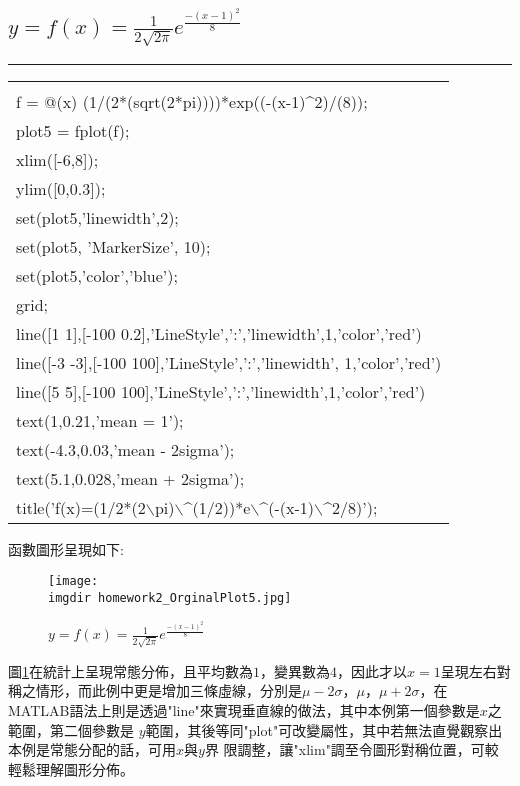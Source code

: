 		\subsection{$y=f(x)=\frac{1}{2\sqrt{2\pi}}e^{\frac{-(x-1)^2}{8}}$}%
		\rule{\textwidth}{0.2pt}
		\begin{center}\colorbox{slight}{
				\begin{tabular}{p{}}
					\MJHmarker{\textbf{MATLAB語法 :}}\\					
					f = @(x) (1/(2*(sqrt(2*pi))))*exp((-(x-1)$\^$2)/(8));\\
					plot5 = fplot(f);\\
					xlim([-6,8]);\\
					ylim([0,0.3]);\\
					set(plot5,'linewidth',2);\\
					set(plot5, 'MarkerSize', 10); \\
					set(plot5,'color','blue');\\
					grid;\\
					line([1 1],[-100 0.2],'LineStyle',':','linewidth',1,'color','red')
					\\line([-3 -3],[-100 100],'LineStyle',':','linewidth',									1,'color','red')\\
					line([5 5],[-100 100],'LineStyle',':','linewidth',1,'color','red')
					\\text(1,0.21,'mean = 1');\\
					text(-4.3,0.03,'mean - 2sigma');\\
					text(5.1,0.028,'mean + 2sigma');\\
					title('f(x)=(1/2*(2$\backslash$pi)$\backslash\^$(1/2))*e$								\backslash\^$(-(x-1)$\backslash\^$2/8)');\\
				\end{tabular}
			}
			\end{center}			
		\newpage
		函數圖形呈現如下:	
		\begin{figure}[H]	
		 	 \centering	 			 	 
   			 \texttt{[image: \\imgdir homework2\_OrginalPlot5.jpg]} 
   			 \caption{$y=f(x)=\frac{1}{2\sqrt{2\pi}}e^{\frac{-(x-1)^2}{8}}$}   		
   			 \label{plot5}   			 		 
		\end{figure}
		
		圖\ref{plot5}在統計上呈現常態分佈，且平均數為$1$，變異數為$4$，因此才以$x=1$呈現左右對			稱之情形，而此例中更是增加三條虛線，分別是$\mu - 2\sigma$，$\mu$，$\mu+2\sigma$，在				MATLAB語法上則是透過"line"來實現垂直線的做法，其中本例第一個參數是$x$之範圍，第二個參數是			$y$範圍，其後等同"plot"可改變屬性，其中若無法直覺觀察出本例是常態分配的話，可用$x$與$y$界			限調整，讓"xlim"調至令圖形對稱位置，可較輕鬆理解圖形分佈。
		\newpage
